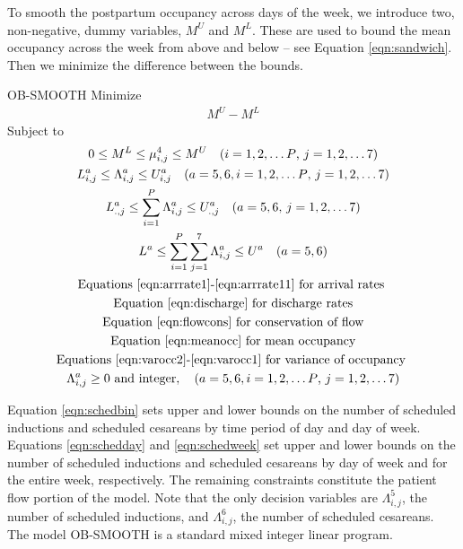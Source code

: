 
To smooth the postpartum occupancy across days of the week, we introduce two, non-negative, dummy variables, $M^{U}$ and $M^{L}$. These are used to bound the mean occupancy across the week from above and below -- see Equation \eqref{eqn:sandwich}. Then we minimize the difference between the bounds.

\newpage
{} OB-SMOOTH
\nipar
\nipar Minimize
\begin{gather}
M^{U} - M^{L} \label{eqn:obj} 
\end{gather}
Subject to
\begin{gather}
0 \leq M^{L} \leq \mu_{i,j}^{4} \leq M^{U} \quad \text{($i=1,2,\ldots P$, $j=1,2,\ldots 7$)} \label{eqn:sandwich} \\ 
L_{i,j}^{a} \leq \Lambda_{i,j}^{a} \leq U_{i,j}^{a} \quad \text{($a=5,6, i=1,2,\ldots P$, $j=1,2,\ldots 7$)} \label{eqn:schedbin} \\
L_{.,j}^{a} \leq \sum_{i=1}^{P}\Lambda_{i,j}^{a} \leq U_{.,j}^{a} \quad \text{($a=5,6$, $j=1,2,\ldots 7$)} \label{eqn:schedday} \\
L^{a} \leq \sum_{i=1}^{P}\sum_{j=1}^{7}\Lambda_{i,j}^{a} \leq U^{a} \quad \text{($a=5,6$)} \label{eqn:schedweek} \\ 
\text{Equations \eqref{eqn:arrrate1}-\eqref{eqn:arrrate11} for arrival rates }  \\
\text{Equation \eqref{eqn:discharge} for discharge rates}  \\
\text{Equation \eqref{eqn:flowcons} for conservation of flow}  \\
\text{Equation \eqref{eqn:meanocc} for mean occupancy} \\
\text{Equations \eqref{eqn:varocc2}-\eqref{eqn:varocc1} for variance of occupancy }  \\
\Lambda_{i,j}^{a} \geq 0 \text{ and integer}, \quad \text{($a=5,6, i=1,2,\ldots P$, $j=1,2,\ldots 7)$} \label{eqn:schedint}
\end{gather} 

Equation \eqref{eqn:schedbin} sets upper and lower bounds on the number of scheduled inductions and scheduled cesareans by time period of day and day of week. Equations \eqref{eqn:schedday} and \eqref{eqn:schedweek} set upper and lower bounds on the number of scheduled inductions and scheduled cesareans by day of week and for the entire week, respectively. The remaining constraints constitute the patient flow portion of the model. Note that the only decision variables are $\Lambda_{i,j}^{5}$, the number of scheduled inductions, and $\Lambda_{i,j}^{6}$, the number of scheduled cesareans. The model OB-SMOOTH is a standard mixed integer linear program. 


